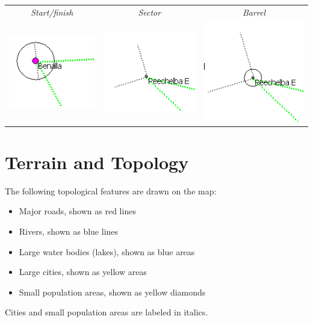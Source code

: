 \documentclass[a4paper,12pt]{refrep}
\begin{document}
\begin{center}

\begin{tabular}{c c c}
{\it Start/finish} & {\it Sector} & {\it Barrel} \\
\includegraphics[angle=0,width=0.3\linewidth,keepaspectratio='true']{figures/cut-startfinish.png} &
\includegraphics[angle=0,width=0.3\linewidth,keepaspectratio='true']{figures/cut-sector.png} &
\includegraphics[angle=0,width=0.3\linewidth,keepaspectratio='true']{figures/cut-barrel.png} \\
\end{tabular}
\end{center}

\section{Terrain and Topology}

The following topological features are drawn on the map:
\begin{itemize}
\item Major roads, shown as red lines
\item Rivers, shown as blue lines
\item Large water bodies (lakes), shown as blue areas
\item Large cities, shown as yellow areas
\item Small population areas, shown as yellow diamonds
\end{itemize}
Cities and small population areas are labeled in italics.
\end{document}
